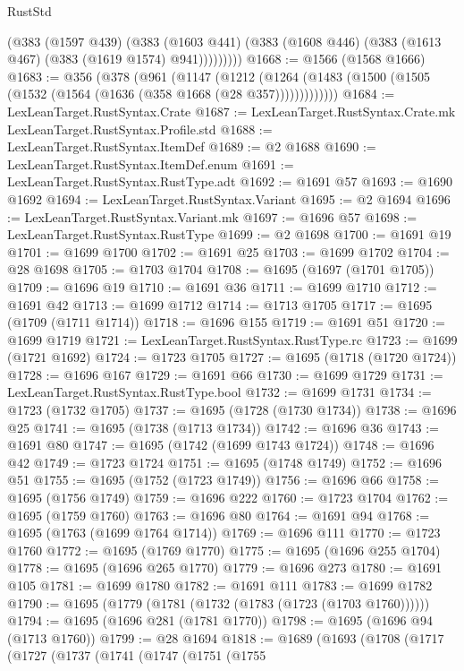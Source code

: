 \begin{lexlean}{RustStd}
\begin{coremodule}
            (@383
              (@1597 @439)
              (@383
                (@1603 @441)
                (@383 (@1608 @446) (@383 (@1613 @467) (@383 (@1619 @1574) @941)))))))))
@1668 := @1566 (@1568 @1666)
@1683 := @356
    (@378
      (@961
        (@1147
          (@1212 (@1264 (@1483 (@1500 (@1505 (@1532 (@1564 (@1636 (@358 @1668 (@28 @357)))))))))))))
@1684 := LexLeanTarget.RustSyntax.Crate
@1687 := LexLeanTarget.RustSyntax.Crate.mk LexLeanTarget.RustSyntax.Profile.std
@1688 := LexLeanTarget.RustSyntax.ItemDef
@1689 := @2 @1688
@1690 := LexLeanTarget.RustSyntax.ItemDef.enum
@1691 := LexLeanTarget.RustSyntax.RustType.adt
@1692 := @1691 @57
@1693 := @1690 @1692
@1694 := LexLeanTarget.RustSyntax.Variant
@1695 := @2 @1694
@1696 := LexLeanTarget.RustSyntax.Variant.mk
@1697 := @1696 @57
@1698 := LexLeanTarget.RustSyntax.RustType
@1699 := @2 @1698
@1700 := @1691 @19
@1701 := @1699 @1700
@1702 := @1691 @25
@1703 := @1699 @1702
@1704 := @28 @1698
@1705 := @1703 @1704
@1708 := @1695 (@1697 (@1701 @1705))
@1709 := @1696 @19
@1710 := @1691 @36
@1711 := @1699 @1710
@1712 := @1691 @42
@1713 := @1699 @1712
@1714 := @1713 @1705
@1717 := @1695 (@1709 (@1711 @1714))
@1718 := @1696 @155
@1719 := @1691 @51
@1720 := @1699 @1719
@1721 := LexLeanTarget.RustSyntax.RustType.rc
@1723 := @1699 (@1721 @1692)
@1724 := @1723 @1705
@1727 := @1695 (@1718 (@1720 @1724))
@1728 := @1696 @167
@1729 := @1691 @66
@1730 := @1699 @1729
@1731 := LexLeanTarget.RustSyntax.RustType.bool
@1732 := @1699 @1731
@1734 := @1723 (@1732 @1705)
@1737 := @1695 (@1728 (@1730 @1734))
@1738 := @1696 @25
@1741 := @1695 (@1738 (@1713 @1734))
@1742 := @1696 @36
@1743 := @1691 @80
@1747 := @1695 (@1742 (@1699 @1743 @1724))
@1748 := @1696 @42
@1749 := @1723 @1724
@1751 := @1695 (@1748 @1749)
@1752 := @1696 @51
@1755 := @1695 (@1752 (@1723 @1749))
@1756 := @1696 @66
@1758 := @1695 (@1756 @1749)
@1759 := @1696 @222
@1760 := @1723 @1704
@1762 := @1695 (@1759 @1760)
@1763 := @1696 @80
@1764 := @1691 @94
@1768 := @1695 (@1763 (@1699 @1764 @1714))
@1769 := @1696 @111
@1770 := @1723 @1760
@1772 := @1695 (@1769 @1770)
@1775 := @1695 (@1696 @255 @1704)
@1778 := @1695 (@1696 @265 @1770)
@1779 := @1696 @273
@1780 := @1691 @105
@1781 := @1699 @1780
@1782 := @1691 @111
@1783 := @1699 @1782
@1790 := @1695 (@1779 (@1781 (@1732 (@1783 (@1723 (@1703 @1760))))))
@1794 := @1695 (@1696 @281 (@1781 @1770))
@1798 := @1695 (@1696 @94 (@1713 @1760))
@1799 := @28 @1694
@1818 := @1689
    (@1693
      (@1708
        (@1717
          (@1727
            (@1737
              (@1741
                (@1747
                  (@1751
                    (@1755

\end{coremodule}
\end{lexlean}
